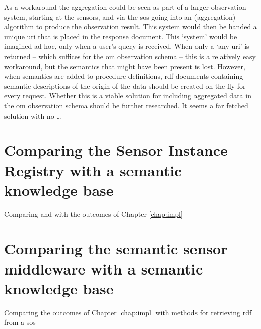As a workaround the aggregation could be seen as part of a larger observation system, starting at the sensors, and via the \ac{sos} going into an (aggregation) algorithm to produce the observation result. This system would then be handed a unique \ac{uri} that is placed in the response document. This `system' would be imagined ad hoc, only when a user's query is received. When only a `any \ac{uri}' is returned -- which suffices for the \ac{om} observation schema -- this is a relatively easy workaround, but the semantics that might have been present is lost. However, when semantics are added to procedure definitions, \ac{rdf} documents containing semantic descriptions of the origin of the data should be created on-the-fly for every request. Whether this is a viable solution for including aggregated data in the \ac{om} observation schema should be further researched. It seems a far fetched solution with no \ldots       

\section{Comparing the Sensor Instance Registry with a semantic knowledge base}
Comparing \cite{SW:OGC3} and \cite{SW:OGC4} with the outcomes of Chapter \ref{chap:impl}

\section{Comparing the semantic sensor middleware with a semantic knowledge base}
Comparing the outcomes of Chapter \ref{chap:impl} with methods for retrieving \ac{rdf} from a \ac{sos}
